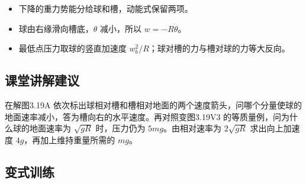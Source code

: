 \documentclass[UTF8,fontset=fandol,a4paper,11pt]{ctexart}
\begin{document}
\begin{itemize}
\item 下降的重力势能分给球和槽，动能式保留两项。
\item 球由右缘滑向槽底，$\theta$ 减小，所以 $w=-R\dot\theta$。
\item 最低点压力取球的竖直加速度 $w_b^2/R$；球对槽的力与槽对球的力等大反向。
\end{itemize}



\subsection*{课堂讲解建议}

在解图3.19A 依次标出球相对槽和槽相对地面的两个速度箭头，问哪个分量使球的地面速率减小，答为槽向右的水平速度。再对照变图3.19V3 的等质量例，问为什么球的地面速率为 $\sqrt{gR}$ 时，压力仍为 $5mg$。由相对速率为 $2\sqrt{gR}$ 求出向上加速度 $4g$，再加上维持重量所需的 $mg$。



\subsection*{变式训练}
\end{document}

